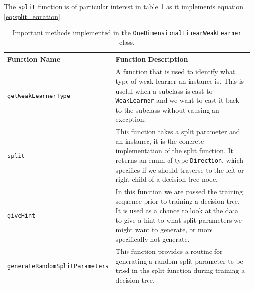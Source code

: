 \documentclass[12pt,twoside,notitlepage]{report}
\begin{document}
                The \texttt{split} function is of particular interest in table \ref{tab:OneDimensionalLinearWeakLearner} as 
                it implements equation \ref{eq:split_equation}. 

                \begin{table}[H]
                    \begin{tabularx}{\textwidth}{l|X}
                        \textbf{Function Name} & \textbf{Function Description} \\
                        \hline

                        \texttt{getWeakLearnerType} & 
                            A function that is used to identify what type of weak learner an instance is. This is 
                            useful when a subclass is cast to \texttt{WeakLearner} and we want to cast it back to 
                            the subclass without causing an exception. \\ 
                        \hline

                        \texttt{split} & 
                            This function takes a split parameter and an instance, it is the concrete implementation 
                            of the split function. It returns an enum of type \texttt{Direction}, which specifies if 
                            we should traverse to the left or right child of a decision tree node. \\ 
                        \hline

                        \texttt{giveHint} & 
                            In this function we are passed the training sequence prior to training a decision tree. 
                            It is used as a chance to look at the data to give a hint to what split parameters we 
                            might want to generate, or more specifically not generate. \\ 
                        \hline

                        \texttt{generateRandomSplitParameters} & 
                            This function provides a routine for generating a random split parameter to be tried in the 
                            split function during training a decision tree. \\ 

                    \end{tabularx}
                    \caption{Important methods implemented in the \texttt{OneDimensionalLinearWeakLearner} class.}
                    \label{tab:OneDimensionalLinearWeakLearner}
                \end{table}
\end{document}
